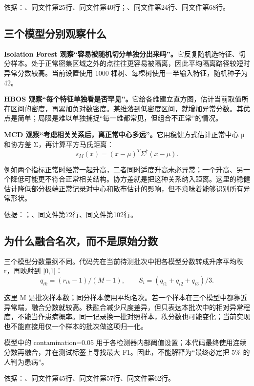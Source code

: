 \documentclass[UTF8,fontset=windows,11pt,a4paper]{ctexart}
\begin{document}
依据：、同文件第25行、同文件第40行；、同文件第24行、同文件第68行。

\subsection{三个模型分别观察什么}

\textbf{Isolation Forest 观察“容易被随机切分单独分出来吗”。}它反复随机选特征、切分样本。处于正常密集区域之外的点往往更容易被隔离，因此平均隔离路径较短时异常分数较高。当前设置使用 1000 棵树、每棵树使用一半输入特征，随机种子为 42。

\textbf{HBOS 观察“每个特征单独看是否罕见”。}它给各维建立直方图，估计当前取值所在区间的密度，再累加负对数密度。某维落到低密度区间，就增加异常分数。其优点是简单；局限是难以单独捕捉“每一维都常见，但组合不正常”的情况。

\textbf{MCD 观察“考虑相关关系后，离正常中心多远”。}它用稳健方式估计正常中心 μ 和协方差 Σ，再计算平方马氏距离：
\[
s_M(x)=(x-\mu)^T\Sigma^{\dagger}(x-\mu).
\]

例如两个指标正常时经常一起升高，二者同时适度升高未必异常；一个升高、另一个降低可能更不符合正常相关结构。协方差就是把这种关系纳入距离。这里的稳健估计降低部分极端正常记录对中心和散布估计的影响，但不意味着能够识别所有异常形状。

依据：；、同文件第72行、同文件第102行。

\subsection{为什么融合名次，而不是原始分数}

三个模型分数量纲不同。代码先在当前待测批次中把各模型分数转成升序平均秩 r，再映射到 [0,1]：
\[
q_{ik}=(r_{ik}-1)/(M-1),\qquad S_i=(q_{i1}+q_{i2}+q_{i3})/3.
\]

这里 M 是批次样本数；同分样本使用平均名次。若一个样本在三个模型中都靠近异常端，融合分数就较高。秩融合减少尺度差异，但只表达本批次中的相对异常程度，不能当作患病概率。同一记录换一批对照样本，秩分数也可能变化；当前实现也不能直接用仅一个样本的批次做这项归一化。

模型中的 contamination=0.05 用于各检测器内部阈值设置；本代码最终使用连续分数再融合，并在测试标签上寻找最大 F1。因此，不能解释为“最终必定把 5\% 的人判为患病”。

依据：、同文件第45行、同文件第57行、同文件第62行。
\end{document}
